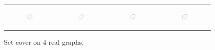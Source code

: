\begin{figure}[ht]
\begin{tabular}{cccc}
\begin{subfigure}[b]{0.22\textwidth}
	  	\includegraphics[width=110pt]{images/validated_CC2G_friendster10M_setcover.pdf}
			\caption{}
			\label{appfig:validated_CC2G_friendster10M_setcover}
	  \end{subfigure} &
	  \begin{subfigure}[b]{0.22\textwidth}
	  	\includegraphics[width=110pt]{images/validated_CC2G_arabic2005_setcover.pdf}
			\caption{}
			\label{appfig:validated_CC2G_arabic2005_setcover}
	  \end{subfigure} &
	  \begin{subfigure}[b]{0.22\textwidth}
	  	\includegraphics[width=110pt]{images/validated_CC2G_uk2005_setcover.pdf}
			\caption{}
			\label{appfig:validated_CC2G_uk2005_setcover}
	  \end{subfigure} &
	  \begin{subfigure}[b]{0.22\textwidth}
	  	\includegraphics[width=110pt]{images/validated_CC2G_it2004_setcover.pdf}
			\caption{}
			\label{appfig:validated_CC2G_it2004_setcover}
	  \end{subfigure} \\
  \end{tabular}
  \caption{Set cover on 4 real graphs.}
\end{figure}



